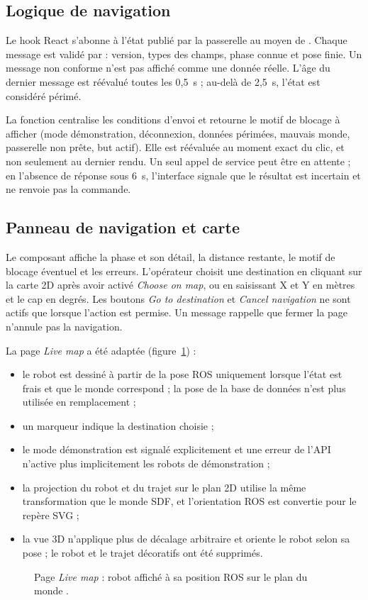 \subsection{Logique de navigation}
Le hook React  s'abonne à l'état publié par la passerelle au moyen de
. Chaque message est validé par  : version,
types des champs, phase connue et pose finie. Un message non conforme n'est pas affiché
comme une donnée réelle. L'âge du dernier message est réévalué toutes les 0,5~s ; au-delà
de 2,5~s, l'état est considéré périmé.

La fonction  centralise les conditions d'envoi et retourne le
motif de blocage à afficher (mode démonstration, déconnexion, données périmées, mauvais
monde, passerelle non prête, but actif). Elle est réévaluée au moment exact du clic, et
non seulement au dernier rendu. Un seul appel de service peut être en attente ; en
l'absence de réponse sous 6~s, l'interface signale que le résultat est incertain et ne
renvoie pas la commande.

\subsection{Panneau de navigation et carte}
Le composant  affiche la phase et son
détail, la distance restante, le motif de blocage éventuel et les erreurs. L'opérateur
choisit une destination en cliquant sur la carte 2D après avoir activé \emph{Choose on
map}, ou en saisissant X et Y en mètres et le cap en degrés. Les boutons \emph{Go to
destination} et \emph{Cancel navigation} ne sont actifs que lorsque l'action est permise.
Un message rappelle que fermer la page n'annule pas la navigation.

La page \emph{Live map} a été adaptée (figure~\ref{fig:livemap}) :
\begin{itemize}
  \item le robot est dessiné à partir de la pose ROS uniquement lorsque l'état est frais
    et que le monde correspond ; la pose de la base de données n'est plus utilisée en
    remplacement ;
  \item un marqueur indique la destination choisie ;
  \item le mode démonstration est signalé explicitement et une erreur de l'API n'active
    plus implicitement les robots de démonstration ;
  \item la projection du robot et du trajet sur le plan 2D utilise la même transformation
    que le monde SDF, et l'orientation ROS est convertie pour le repère SVG ;
  \item la vue 3D n'applique plus de décalage arbitraire et oriente le robot selon sa pose ;
    le robot et le trajet décoratifs ont été supprimés.
\end{itemize}
\begin{figure}[htbp]
\centering
{}
\caption{Page \emph{Live map} : robot  affiché à sa position ROS sur le plan
du monde .}
\label{fig:livemap}
\end{figure}

